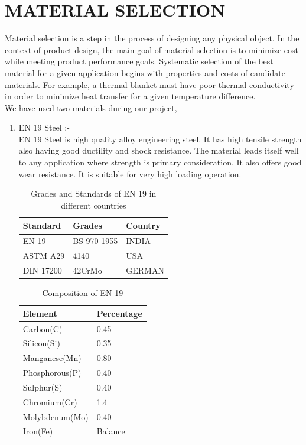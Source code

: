 \documentclass[16pt,a4paper]{article}
\begin{document}
\pagebreak

\section{MATERIAL SELECTION}
Material selection is a step in the process of designing any physical object. In the context of product design, the main goal of material selection is to minimize cost while meeting product performance goals. Systematic selection of the best material for a given application begins with properties and costs of candidate materials. For example, a thermal blanket must have poor thermal conductivity in order to minimize heat transfer for a given temperature difference.
\\We have used two materials during our project,

\begin{enumerate}

\item EN 19 Steel :- 
\\EN 19 Steel is high quality alloy engineering steel. It has high tensile strength also having good ductility and shock resistance. The material leads itself well to any application where strength is primary consideration. It also offers good wear resistance. It is suitable for very high loading operation.

\begin{table}[H]

\centering
\caption{Grades and Standards of EN 19 in different countries}  
\begin{tabular}{| l | l | l |}
\hline
 Standard & Grades & Country \\
\hline
 EN 19 & BS 970-1955 & INDIA \\
\hline
 ASTM A29 & 4140 & USA \\
\hline
 DIN 17200 & 42CrMo & GERMAN \\
\hline
\end{tabular}

\end{table}

\begin{table}[H]

\centering
\caption{Composition of EN 19}
\begin{tabular}{| l | l |}
\hline
Element & Percentage \\
\hline
Carbon(C) & 0.45 \\
\hline
Silicon(Si) & 0.35 \\
\hline
Manganese(Mn) & 0.80 \\
\hline
Phosphorous(P) & 0.40 \\
\hline
Sulphur(S) & 0.40 \\
\hline
Chromium(Cr) & 1.4 \\
\hline
Molybdenum(Mo) & 0.40 \\
\hline
Iron(Fe) & Balance \\
\hline
\end{tabular}


\end{table}
\end{enumerate}
\end{document}
